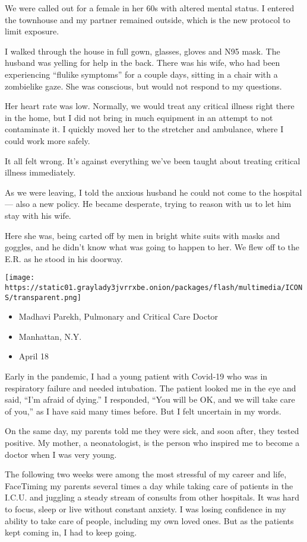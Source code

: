 We were called out for a female in her 60s with altered mental status. I
entered the townhouse and my partner remained outside, which is the new
protocol to limit exposure.

I walked through the house in full gown, glasses, gloves and N95 mask.
The husband was yelling for help in the back. There was his wife, who
had been experiencing ``flulike symptoms'' for a couple days, sitting in
a chair with a zombielike gaze. She was conscious, but would not respond
to my questions.

Her heart rate was low. Normally, we would treat any critical illness
right there in the home, but I did not bring in much equipment in an
attempt to not contaminate it. I quickly moved her to the stretcher and
ambulance, where I could work more safely.

It all felt wrong. It's against everything we've been taught about
treating critical illness immediately.

As we were leaving, I told the anxious husband he could not come to the
hospital --- also a new policy. He became desperate, trying to reason
with us to let him stay with his wife.

Here she was, being carted off by men in bright white suits with masks
and goggles, and he didn't know what was going to happen to her. We flew
off to the E.R. as he stood in his doorway.

\texttt{[image: https://static01.graylady3jvrrxbe.onion/packages/flash/multimedia/ICONS/transparent.png]}

\begin{itemize}
\tightlist
\item
  Madhavi Parekh, Pulmonary and Critical Care Doctor
\item
  Manhattan, N.Y.
\item
  April 18
\end{itemize}

Early in the pandemic, I had a young patient with Covid-19 who was in
respiratory failure and needed intubation. The patient looked me in the
eye and said, ``I'm afraid of dying.'' I responded, ``You will be OK,
and we will take care of you,'' as I have said many times before. But I
felt uncertain in my words.

On the same day, my parents told me they were sick, and soon after, they
tested positive. My mother, a neonatologist, is the person who inspired
me to become a doctor when I was very young.

The following two weeks were among the most stressful of my career and
life, FaceTiming my parents several times a day while taking care of
patients in the I.C.U. and juggling a steady stream of consults from
other hospitals. It was hard to focus, sleep or live without constant
anxiety. I was losing confidence in my ability to take care of people,
including my own loved ones. But as the patients kept coming in, I had
to keep going.

